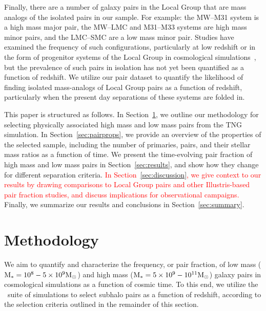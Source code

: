 \documentclass[twocolumn]{aastex631}
\newcommand{\add}[1]{\textcolor{red}{#1}}
\newcommand{\ms}[1]{\ensuremath{M_{*{#1}}}}
\begin{document}
    Finally, there are a number of galaxy pairs in the Local Group that are mass analogs of the isolated pairs in our sample.
    For example: the MW--M31 system is a high mass major pair, the MW--LMC and M31--M33 systems are high mass minor pairs, and the LMC--SMC are a low mass minor pair.
    Studies have examined the frequency of such configurations, particularly at low redshift or in the form of progenitor systems of the Local Group in cosmological simulations~\citep{Bk2011,Fattahi2013,Patel2017a-Orbits,Geha2017,Mao2021}, but the prevalence of such pairs in isolation has not yet been quantified as a function of redshift. 
    We utilize our pair dataset to quantify the likelihood of finding isolated mass-analogs of Local Group pairs as a function of redshift, particularly when the present day separations of these systems are folded in. 
    
    This paper is structured as follows. 
    In Section~\ref{sec:methods}, we outline our methodology for selecting physically associated high mass and low mass pairs from the TNG simulation. 
    In Section~\ref{sec:pairprops}, we provide an overview of the properties of the selected sample, including the number of primaries, pairs, and their stellar mass ratios as a function of time. 
    We present the time-evolving pair fraction of high mass and low mass pairs in Section~\ref{sec:results}, and show how they change for different separation criteria. 
    \add{In Section~\ref{sec:discussion}, we give context to our results by drawing comparisons to Local Group pairs and other Illustris-based pair fraction studies, and discuss implications for observational campaigns.}
    Finally, we summarize our results and conclusions in Section~\ref{sec:summary}.

 
\section{Methodology}\label{sec:methods}
We aim to quantify and characterize the frequency, or pair fraction, of low mass ($\rm\ms{}=10^{8}-5\times 10^{9}\Msun$) and high mass ($\rm\ms{}=5\times10^{9}-10^{11}\Msun$) galaxy pairs in cosmological simulations as a function of cosmic time. 
To this end, we utilize the \tng\ suite of simulations to select subhalo pairs as a function of redshift, according to the selection criteria outlined in the remainder of this section. 
\end{document}
